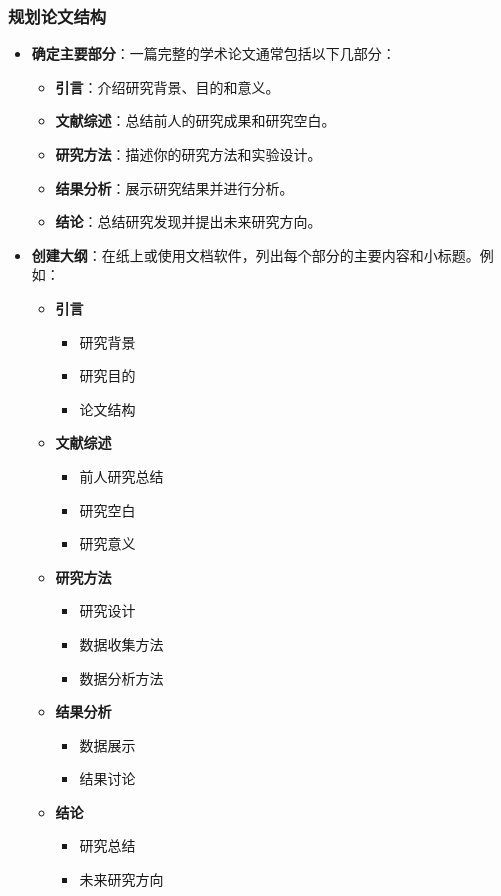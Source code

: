 \subsubsection{规划论文结构}
\begin{itemize}
    \item \textbf{确定主要部分}：一篇完整的学术论文通常包括以下几部分：
    \begin{itemize}
        \item \textbf{引言}：介绍研究背景、目的和意义。
        \item \textbf{文献综述}：总结前人的研究成果和研究空白。
        \item \textbf{研究方法}：描述你的研究方法和实验设计。
        \item \textbf{结果分析}：展示研究结果并进行分析。
        \item \textbf{结论}：总结研究发现并提出未来研究方向。
    \end{itemize}
    \item \textbf{创建大纲}：在纸上或使用文档软件，列出每个部分的主要内容和小标题。例如：
    \begin{itemize}
        \item \textbf{引言}
        \begin{itemize}
            \item 研究背景
            \item 研究目的
            \item 论文结构
        \end{itemize}
        \item \textbf{文献综述}
        \begin{itemize}
            \item 前人研究总结
            \item 研究空白
            \item 研究意义
        \end{itemize}
        \item \textbf{研究方法}
        \begin{itemize}
            \item 研究设计
            \item 数据收集方法
            \item 数据分析方法
        \end{itemize}
        \item \textbf{结果分析}
        \begin{itemize}
            \item 数据展示
            \item 结果讨论
        \end{itemize}
        \item \textbf{结论}
        \begin{itemize}
            \item 研究总结
            \item 未来研究方向
        \end{itemize}
    \end{itemize}
\end{itemize}

